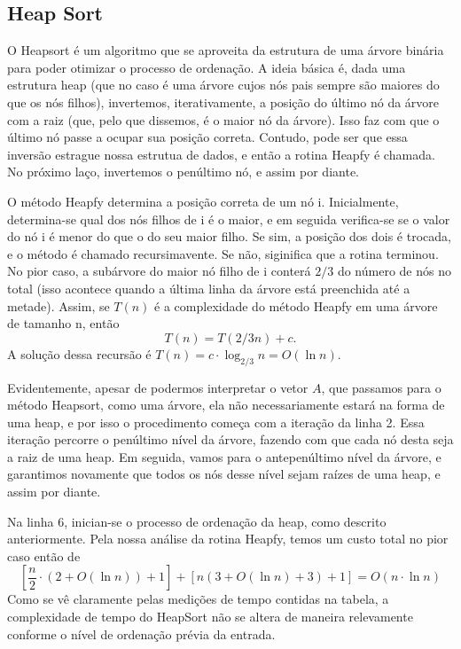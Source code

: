 \documentclass{article}
\begin{document}
\subsection{Heap Sort}
O Heapsort é um algoritmo que se aproveita da estrutura de uma árvore binária para poder otimizar o processo de ordenação. A ideia básica é, dada uma estrutura heap (que no caso é uma árvore cujos nós pais sempre são maiores do que os nós filhos), invertemos, iterativamente, a posição do último nó da árvore com a raiz (que, pelo que dissemos, é o maior nó da árvore). Isso faz com que o último nó passe a ocupar sua posição correta. Contudo, pode ser que essa inversão estrague nossa estrutua de dados, e então a rotina Heapfy é chamada. No próximo laço, invertemos o penúltimo nó, e assim por diante.\par
%
O método Heapfy determina a posição correta de um nó i. Inicialmente, determina-se qual dos nós filhos de i é o maior, e em seguida verifica-se se o valor do nó i é menor do que o do seu maior filho. Se sim, a posição dos dois é trocada, e o método é chamado recursimavente. Se não, siginifica que a rotina terminou. No pior caso, a subárvore do maior nó filho de i conterá $2/3$ do número de nós no total (isso acontece quando a última linha da árvore está preenchida até a metade). Assim, se $T(n)$ é a complexidade do método Heapfy em uma árvore de tamanho n, então \[T(n) = T(2/3n) + c.\]
A solução dessa recursão é $T(n) = c \cdot \log_{2/3}n = O(\ln n).$\par
Evidentemente, apesar de podermos interpretar o vetor $A$, que passamos para o método Heapsort, como uma árvore, ela não necessariamente estará na forma de uma heap, e por isso o procedimento começa com a iteração da linha 2. Essa iteração percorre o penúltimo nível da árvore, fazendo com que cada nó desta seja a raiz de uma heap. Em seguida, vamos para o antepenúltimo nível da árvore, e garantimos novamente que todos os nós desse nível sejam raízes de uma heap, e assim por diante.\par
Na linha 6, inician-se o processo de ordenação da heap, como descrito anteriormente. Pela nossa análise da rotina Heapfy, temos um custo total no pior caso então de \[\left[\frac{n}{2}\cdot(2+O(\ln n)) + 1\right]+ \left[n(3 + O(\ln n) + 3) + 1\right] = O(n\cdot \ln n)\]
Como se vê claramente pelas medições de tempo contidas na tabela, a complexidade de tempo do HeapSort não se altera de maneira relevamente conforme o nível de ordenação prévia da entrada.
\end{document}
